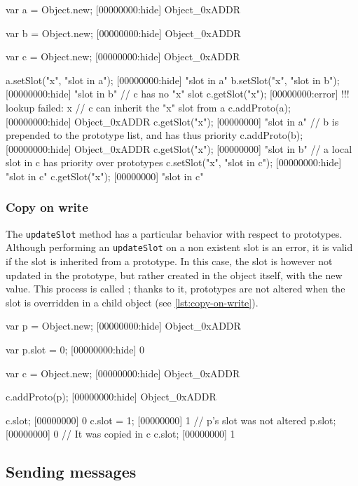 \begin{urbiscript}[caption=Slots inheritance, label=lst:inheritance,
  float=\floatpos]
var a = Object.new;
[00000000:hide] Object_0xADDR

var b = Object.new;
[00000000:hide] Object_0xADDR

var c = Object.new;
[00000000:hide] Object_0xADDR

a.setSlot("x", "slot in a");
[00000000:hide] "slot in a"
b.setSlot("x", "slot in b");
[00000000:hide] "slot in b"
// c has no "x" slot
c.getSlot("x");
[00000000:error] !!! lookup failed: x
// c can inherit the "x" slot from a
c.addProto(a);
[00000000:hide] Object_0xADDR
c.getSlot("x");
[00000000] "slot in a"
// b is prepended to the prototype list, and has thus priority
c.addProto(b);
[00000000:hide] Object_0xADDR
c.getSlot("x");
[00000000] "slot in b"
// a local slot in c has priority over prototypes
c.setSlot("x", "slot in c");
[00000000:hide] "slot in c"
c.getSlot("x");
[00000000] "slot in c"
\end{urbiscript}

\subsubsection{Copy on write}

The \lstinline|updateSlot| method has a particular behavior with
respect to prototypes. Although performing an \lstinline|updateSlot|
on a non existent slot is an error, it is valid if the slot is
inherited from a prototype. In this case, the slot is however not
updated in the prototype, but rather created in the object itself,
with the new value. This process is called ; thanks
to it, prototypes are not altered when the slot is overridden in a
child object (see \autoref{lst:copy-on-write}).

\begin{urbiscript}[caption=Copy on write, label=lst:copy-on-write,
  float=\floatpos]
var p = Object.new;
[00000000:hide] Object_0xADDR

var p.slot = 0;
[00000000:hide] 0

var c = Object.new;
[00000000:hide] Object_0xADDR

c.addProto(p);
[00000000:hide] Object_0xADDR

c.slot;
[00000000] 0
c.slot = 1;
[00000000] 1
// p's slot was not altered
p.slot;
[00000000] 0
// It was copied in c
c.slot;
[00000000] 1
\end{urbiscript}

\subsection{Sending messages}

